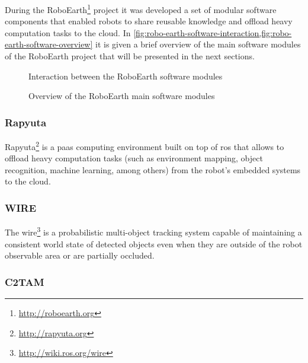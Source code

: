 During the RoboEarth\footnote{\url{http://roboearth.org}} project it was developed a set of modular software components that enabled robots to share reusable knowledge and offload heavy computation tasks to the cloud. In \cref{fig:robo-earth-software-interaction,fig:robo-earth-software-overview} it is given a brief overview of the main software modules of the RoboEarth project that will be presented in the next sections.


\begin{figure}[H]
	\begin{floatrow}[2]
		{\caption[Interaction between the RoboEarth software modules]{Interaction between the RoboEarth software modules \cite{DiMarco2013}}\label{fig:robo-earth-software-interaction}}

		{\caption[Overview of the RoboEarth main software modules]{Overview of the RoboEarth main software modules\protect\footnotemark}\label{fig:robo-earth-software-overview}}
	\end{floatrow}
\end{figure}



\subsubsection{Rapyuta}

Rapyuta\footnote{\url{http://rapyuta.org}} \cite{Hunziker2013} is a \gls{paas} computing environment built on top of \gls{ros} that allows to offload heavy computation tasks (such as environment mapping, object recognition, machine learning, among others) from the robot's embedded systems to the cloud.


\subsubsection{WIRE}

The \gls{wire}\footnote{\url{http://wiki.ros.org/wire}} \cite{Elfring2013} is a probabilistic multi-object tracking system capable of maintaining a consistent world state of detected objects even when they are outside of the robot observable area or are partially occluded.


\subsubsection{C2TAM}

